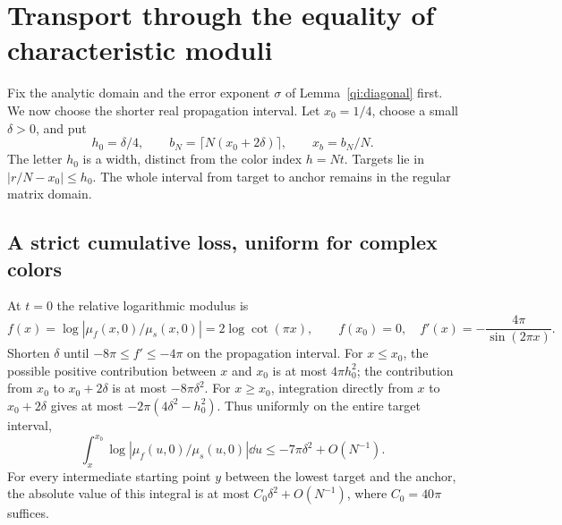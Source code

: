 \section{Transport through the equality of characteristic moduli}\label{qi:source-proof}

Fix the analytic domain and the error exponent $\sigma$ of
Lemma~\ref{qi:diagonal} first. We now choose the shorter real
propagation interval. Let $x_0=1/4$, choose a small $\delta>0$, and put
\[
 h_0=\delta/4,\qquad b_N=\lceil N(x_0+2\delta)\rceil,\qquad x_b=b_N/N.
\]
The letter $h_0$ is a width, distinct from the color index $h=Nt$.
Targets lie in $|r/N-x_0|\le h_0$. The whole interval from target to anchor remains in the regular matrix domain.

\subsection{A strict cumulative loss, uniform for complex colors}

At $t=0$ the relative logarithmic modulus is
\begin{equation}\label{qi:f}
 f(x)=\log|\mu_f(x,0)/\mu_s(x,0)|
          =2\log\cot(\pi x),\qquad
 f(x_0)=0,\quad f'(x)=-\frac{4\pi}{\sin(2\pi x)}.
\end{equation}
Shorten $\delta$ until $-8\pi\le f'\le-4\pi$ on the propagation interval. For $x\le x_0$, the possible positive contribution between $x$ and $x_0$ is at most $4\pi h_0^2$; the contribution from $x_0$ to $x_0+2\delta$ is at most $-8\pi\delta^2$. For $x\ge x_0$, integration directly from $x$ to $x_0+2\delta$ gives at most
$-2\pi(4\delta^2-h_0^2)$. Thus uniformly on the entire target interval,
\begin{equation}\label{qi:negative-action}
 \int_x^{x_b}\log|\mu_f(u,0)/\mu_s(u,0)|\dd u
      \le-7\pi\delta^2+O(N^{-1}).
\end{equation}
For every intermediate starting point $y$ between the lowest target and the anchor, the absolute value of this integral is at most
$C_0\delta^2+O(N^{-1})$, where $C_0=40\pi$ suffices.


